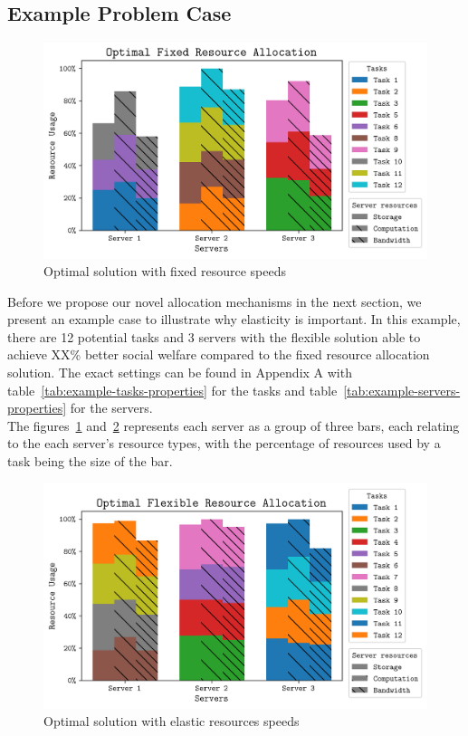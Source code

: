 \subsection{Example Problem Case}
\label{subsec:example-problem-case}
\begin{figure}
    \centering
    \includegraphics[width=\linewidth]{figs/allocation/optimal_fixed_resource_allocation.png}
    \caption{Optimal solution with fixed resource speeds}
    \label{fig:example-fixed-allocation}
\end{figure}
Before we propose our novel allocation mechanisms in the next section, we present an example case to illustrate 
why elasticity is important. In this example, there are 12 potential tasks and 3 servers with the flexible solution able 
to achieve XX\% better social welfare compared to the fixed resource allocation solution. 
The exact settings can be found in Appendix A with table~\ref{tab:example-tasks-properties}
for the tasks and table~\ref{tab:example-servers-properties} for the servers. \\
The figures~\ref{fig:example-fixed-allocation} and~\ref{fig:example-flexible-allocation} represents each server as a
group of three bars, each relating to the each server's resource types, with the percentage of resources used by a task
being the size of the bar.

\begin{figure}
    \centering
    \includegraphics[width=\linewidth]{figs/allocation/optimal_flexible_resource_allocation.png}
    \caption{Optimal solution with elastic resources speeds}
    \label{fig:example-flexible-allocation}
\end{figure}

